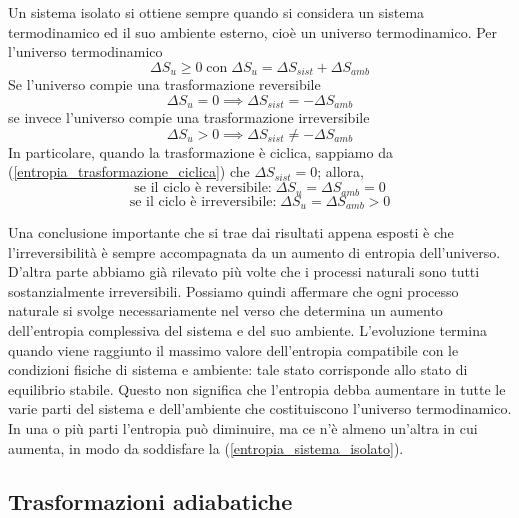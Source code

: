 \documentclass[class=book, crop=false, oneside, 12pt]{standalone}
\begin{document}
Un sistema isolato si ottiene sempre quando si considera un sistema termodinamico ed il suo ambiente esterno, cioè un universo termodinamico.\newline
Per l'universo termodinamico
\begin{equation*}
    \Delta S_u \geq 0 \; \text{con} \; \Delta S_u = \Delta S_{sist} + \Delta S_{amb}
\end{equation*}
Se l'universo compie una trasformazione reversibile 
\begin{equation*}
    \Delta S_u = 0 \implies \Delta S_{sist} = - \Delta S_{amb}
\end{equation*}
se invece l'universo compie una trasformazione irreversibile
\begin{equation*}
    \Delta S_u > 0 \implies \Delta S_{sist} \neq -\Delta S_{amb}
\end{equation*}
In particolare, quando la trasformazione è ciclica, sappiamo da (\ref{entropia_trasformazione_ciclica}) che \(\Delta S_{sist}  =0\); allora,
\begin{equation*}
    \text{se il ciclo è reversibile:} \; \Delta S_u = \Delta S_{amb} = 0
\end{equation*}
\begin{equation*}
    \text{se il ciclo è irreversibile:} \; \Delta S_u = \Delta S_{amb} > 0 
\end{equation*}

Una conclusione importante che si trae dai risultati appena esposti è che l'irreversibilità è sempre accompagnata da un aumento di entropia dell'universo. 
D'altra parte abbiamo già rilevato più volte che i processi naturali sono tutti sostanzialmente irreversibili. 
Possiamo quindi affermare che ogni processo naturale si svolge necessariamente nel verso che determina un aumento dell'entropia complessiva del sistema e del suo ambiente. 
L'evoluzione termina quando viene raggiunto il massimo valore dell'entropia compatibile con le condizioni fisiche di sistema e ambiente: tale stato corrisponde allo stato di equilibrio stabile.
Questo non significa che l'entropia debba aumentare in tutte le varie parti del sistema e dell'ambiente che costituiscono l'universo termodinamico. 
In una o più parti l'entropia può diminuire, ma ce n'è almeno un'altra in cui aumenta, in modo da soddisfare la (\ref{entropia_sistema_isolato}).

\subsection{Trasformazioni adiabatiche}
\end{document}
